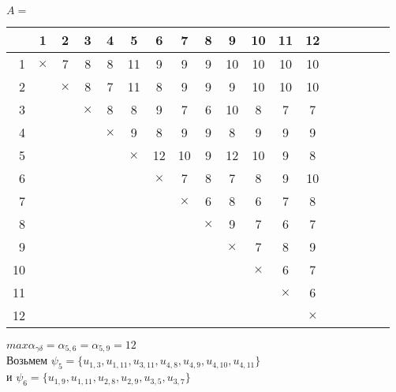 \documentclass[a4paper,12pt]{article}
\begin{document}
    \begin{table}[H]
        \centering

        $A=$
        \begin{tabular}{r|*{17}{c}}
            &1&2&3&4&5&6&7&8&9&10&11&12\\
            \hline
            1&$\times$&7&8&8&11&9&9&9&10&10&10&10\\
            2&&$\times$&8&7&11&8&9&9&9&10&10&10\\
            3&&&$\times$&8&8&9&7&6&10&8&7&7\\
            4&&&&$\times$&9&8&9&9&8&9&9&9\\
            5&&&&&$\times$&12&10&9&12&10&9&8\\
            6&&&&&&$\times$&7&8&7&8&9&10\\
            7&&&&&&&$\times$&6&8&6&7&8\\
            8&&&&&&&&$\times$&9&7&6&7\\
            9&&&&&&&&&$\times$&7&8&9\\
            10&&&&&&&&&&$\times$&6&7\\
            11&&&&&&&&&&&$\times$&6\\
            12&&&&&&&&&&&&$\times$\\
        \end{tabular}
    \end{table}

    \noindent
    $max \alpha_{\gamma\delta}=\alpha_{5,6}=\alpha_{5,9}=12$\\

    \noindent
    Возьмем $\psi_{5}=\{u_{1,3},u_{1,11},u_{3,11},u_{4,8},u_{4,9},u_{4,10},u_{4,11}\}$\\
    и $\psi_{6}=\{u_{1,9},u_{1,11},u_{2,8},u_{2,9},u_{3,5},u_{3,7}\}$
\end{document}
